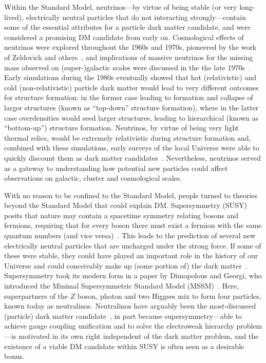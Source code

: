 Within the Standard Model, neutrinos---by virtue of being stable (or very long-lived), electrically neutral particles that do not interacting strongly---contain some of the essential attributes for a particle dark matter candidate, and were considered a promising DM candidate from early on. Cosmological effects of neutrinos were explored throughout the 1960s and 1970s, pioneered by the work of Zeldovich and others~\cite{Gershtein:1966gg,PhysRevLett.29.669}, and implications of massive neutrinos for the missing mass observed on (super-)galactic scales were discussed in the the late 1970s~\cite{PhysRevLett.39.165,1978ApJ...223.1015G}. Early simulations during the 1980s eventually showed that hot (relativistic) and cold (non-relativistic) particle dark matter would lead to very different outcomes for structure formation: in the former case leading to formation and collapse of larger structures (known as ``top-down'' structure formation), where in the latter case overdensities would seed larger structures, leading to hierarchical (known as ``bottom-up'') structure formation. Neutrinos, by virtue of being very light thermal relics, would be extremely relativistic during structure formation and, combined with these simulations, early surveys of the local Universe were able to quickly discount them as dark matter candidates~\cite{1983ApJ...274L...1W}. Nevertheless, neutrinos served as a gateway to understanding how potential new particles could affect observations on galactic, cluster and cosmological scales.

With no reason to be confined to the Standard Model, people turned to theories beyond the Standard Model that could explain DM. Supersymmetry (SUSY) posits that nature may contain a spacetime symmetry relating bosons and fermions, requiring that for every boson there must exist a fermion with the same quantum numbers (and vice versa)~\cite{Wess:1974tw,PhysRevLett.48.223}. This leads to the prediction of several new electrically neutral particles that are uncharged under the strong force. If some of these were stable, they could have played an important role in the history of our Universe and could conceivably make up (some portion of) the dark matter~\cite{Jungman:1995df}. Supersymmetry took its modern form in a paper by Dimopolous and Georgi, who introduced the Minimal Supersymmetric Standard Model (MSSM)~\cite{Dimopoulos:1981zb}. Here, superpartners of the $Z$ boson, photon and two Higgses mix to form four particles, known today as neutralinos. Neutralinos have arguably been the most-discussed (particle) dark matter candidate~\cite{Bertone:2004pz}, in part because supersymmetry---able to achieve gauge coupling unification and to solve the electroweak hierarchy problem---is motivated in its own right independent of the dark matter problem, and the existence of a viable DM candidate within SUSY is often seen as a desirable bonus.

